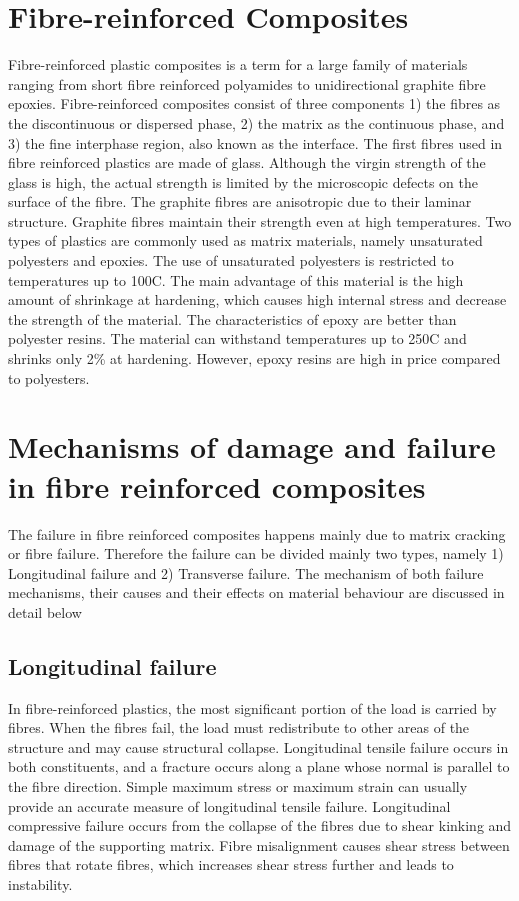 \documentclass[12pt,twoside]{report}
\begin{document}
\section{Fibre-reinforced Composites}
\indent\indent\indent  Fibre-reinforced plastic composites is a term for a large family of materials ranging from short fibre reinforced polyamides to unidirectional graphite fibre epoxies. Fibre-reinforced composites consist of three components 1) the fibres as the discontinuous or dispersed phase, 2) the matrix as the continuous phase, and 3) the fine interphase region, also known as the interface.  The first fibres used in fibre reinforced plastics are made of glass. Although the virgin strength of the glass is high, the actual strength is limited by the microscopic defects on the surface of the fibre. The graphite fibres are anisotropic due to their laminar structure. Graphite fibres maintain their strength even at high temperatures. Two types of plastics are commonly used as matrix materials, namely unsaturated polyesters and epoxies. The use of unsaturated polyesters is restricted to temperatures up to 100C. The main advantage of this material is the high amount of shrinkage at hardening, which causes high internal stress and decrease the strength of the material.  The characteristics of epoxy are better than polyester resins. The material can withstand temperatures up to 250C and shrinks only  2\%  at hardening. However, epoxy resins are high in price compared to polyesters.


\section{Mechanisms of damage and failure in fibre reinforced composites}
\indent\indent\indent The failure in fibre reinforced composites happens mainly due to matrix cracking or fibre failure. Therefore the failure can be divided mainly two types, namely 1) Longitudinal failure and 2) Transverse failure. The mechanism of both failure mechanisms, their causes and their effects on material behaviour are discussed in detail below

\subsection{Longitudinal failure}
\indent\indent\indent  In fibre-reinforced plastics, the most significant portion of the load is carried by fibres. When the fibres fail, the load must redistribute to other areas of the structure and may cause structural collapse.  Longitudinal tensile failure occurs in both constituents, and a fracture occurs along a plane whose normal is parallel to the fibre direction. Simple maximum stress or maximum strain can usually provide an accurate measure of longitudinal tensile failure. Longitudinal compressive failure occurs from the collapse of the fibres due to shear kinking and damage of the supporting matrix. Fibre misalignment causes shear stress between fibres that rotate fibres, which increases shear stress further and leads to instability. 
 
\end{document}
